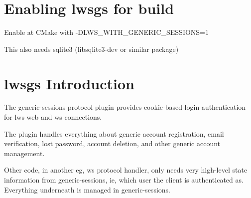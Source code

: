 \hypertarget{md_README.generic-sessions_gseb}{}\section{Enabling lwsgs for build}\label{md_README.generic-sessions_gseb}
Enable at C\+Make with -\/\+D\+L\+W\+S\+\_\+\+W\+I\+T\+H\+\_\+\+G\+E\+N\+E\+R\+I\+C\+\_\+\+S\+E\+S\+S\+I\+O\+NS=1

This also needs sqlite3 (libsqlite3-\/dev or similar package)\hypertarget{md_README.generic-sessions_gsi}{}\section{lwsgs Introduction}\label{md_README.generic-sessions_gsi}
The generic-\/sessions protocol plugin provides cookie-\/based login authentication for lws web and ws connections.

The plugin handles everything about generic account registration, email verification, lost password, account deletion, and other generic account management.

Other code, in another eg, ws protocol handler, only needs very high-\/level state information from generic-\/sessions, ie, which user the client is authenticated as. Everything underneath is managed in generic-\/sessions.


